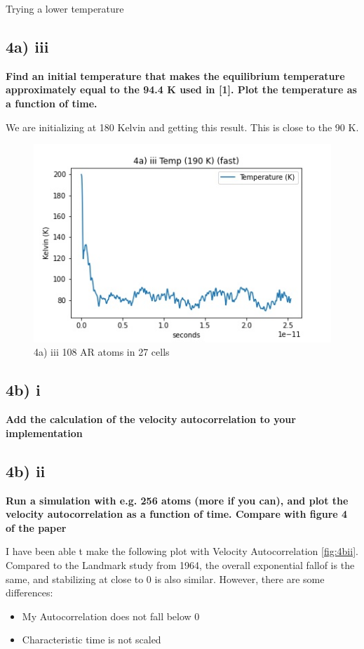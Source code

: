 \documentclass[a4paper,10pt,english]{article}
\begin{document}
Trying a lower temperature

\subsection*{4a) iii }
\textbf{Find an initial temperature that makes the equilibrium temperature approximately equal to the
94.4 K used in [1]. Plot the temperature as a function of time.
}


We are initializing at 180 Kelvin and getting this result. This is close to the 90 K. 
\begin{figure}[h!]
        \centering 
        \includegraphics[scale=0.6]{./py/4a_iii_fast.jpg} 
        \caption{4a) iii 108 AR atoms in 27 cells  }
        \label{fig:3biv}
\end{figure}


\subsection*{4b) i}
\textbf{Add the calculation of the velocity autocorrelation to your implementation}

\newpage
\subsection*{4b) ii}
\textbf{Run a simulation with e.g. 256 atoms (more if you can), and plot the velocity autocorrelation as
a function of time. Compare with figure 4 of the paper}

I have been able t make the following plot with Velocity Autocorrelation \ref{fig:4bii}. Compared to the Landmark study from 1964, the overall exponential fallof is the same, and stabilizing at close to 0 is also similar. However, there are some differences:
\begin{itemize}
\item My Autocorrelation does not fall below 0
\item Characteristic time is not scaled
\end{itemize}
\end{document}
